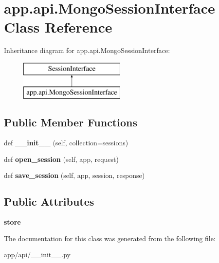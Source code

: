 \hypertarget{classapp_1_1api_1_1_mongo_session_interface}{}\section{app.\+api.\+Mongo\+Session\+Interface Class Reference}
\label{classapp_1_1api_1_1_mongo_session_interface}
Inheritance diagram for app.\+api.\+Mongo\+Session\+Interface\+:\begin{figure}[H]
\begin{center}
\leavevmode
\includegraphics[height=2.000000cm]{classapp_1_1api_1_1_mongo_session_interface}
\end{center}
\end{figure}
\subsection*{Public Member Functions}
\begin{DoxyCompactItemize}
\item 
\mbox{\label{classapp_1_1api_1_1_mongo_session_interface_a3f6ad586be55a3c5c3a0bcdc50973dc8}} 
def {\bfseries \+\_\+\+\_\+init\+\_\+\+\_\+} (self, collection=\textquotesingle{}sessions\textquotesingle{})
\item 
\mbox{\label{classapp_1_1api_1_1_mongo_session_interface_add2a4accbc7273752a143d7657481ed7}} 
def {\bfseries open\+\_\+session} (self, app, request)
\item 
\mbox{\label{classapp_1_1api_1_1_mongo_session_interface_a8a07d12fd2993d6b909e733a587f9d3e}} 
def {\bfseries save\+\_\+session} (self, app, session, response)
\end{DoxyCompactItemize}
\subsection*{Public Attributes}
\begin{DoxyCompactItemize}
\item 
\mbox{\label{classapp_1_1api_1_1_mongo_session_interface_a4b28490dabb5b75d9a741c82a604cc71}} 
{\bfseries store}
\end{DoxyCompactItemize}


The documentation for this class was generated from the following file\+:\begin{DoxyCompactItemize}
\item 
app/api/\+\_\+\+\_\+init\+\_\+\+\_\+.\+py\end{DoxyCompactItemize}
